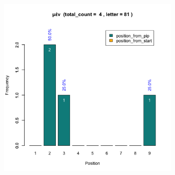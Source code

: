 \documentclass[a4paper]{article}
\begin{document}
\begin{figure}
\begin{subfigure}{0.45\textwidth}
\centering
\includegraphics[width=1\linewidth]{../../data/output/peter_R_par/plots/par4_lt81.png}
\end{subfigure}
\end{figure}
\end{document}
